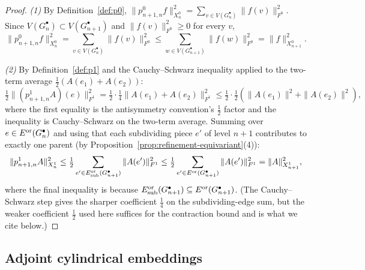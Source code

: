\documentclass[11pt, a4paper]{amsart}
\theoremstyle{definition}
\begin{document}
\begin{proof}
\emph{(1)} By Definition~\ref{def:p0},
$\|p_{n+1, n}^0 f\|_{X_n^0}^2 = \sum_{v \in V(G_n^\bullet)}
\|f(v)\|_{F^0}^2$. Since $V(G_n^\bullet) \subset
V(G_{n+1}^\bullet)$ and $\|f(v)\|_{F^0}^2 \geq 0$ for every $v$,
\[
  \|p_{n+1, n}^0 f\|_{X_n^0}^2 = \sum_{v \in V(G_n^\bullet)}
    \|f(v)\|_{F^0}^2 \leq \sum_{w \in V(G_{n+1}^\bullet)}
    \|f(w)\|_{F^0}^2 = \|f\|_{X_{n+1}^0}^2.
\]

\emph{(2)} By Definition~\ref{def:p1} and the Cauchy--Schwarz
inequality applied to the two-term average $\tfrac{1}{2}(A(e_1) +
A(e_2))$:
\[
  \tfrac{1}{2}\|(p_{n+1, n}^1 A)(e)\|_{F^1}^2
  = \tfrac{1}{2} \cdot \tfrac{1}{4} \|A(e_1) + A(e_2)\|_{F^1}^2
  \leq \tfrac{1}{2} \cdot \tfrac{1}{2} (\|A(e_1)\|^2 + \|A(e_2)\|^2),
\]
where the first equality is the antisymmetry convention's
$\tfrac{1}{2}$ factor and the inequality is Cauchy--Schwarz on the
two-term average. Summing over $e \in E^{\rm or}(G_n^\bullet)$
and using that each subdividing piece $e'$ of level $n+1$
contributes to exactly one parent (by
Proposition~\ref{prop:refinement-equivariant}(4)):
\[
  \|p_{n+1, n}^1 A\|_{X_n^1}^2
  \leq \tfrac{1}{2} \sum_{e' \in E^{\rm or}_{\rm sub}(G_{n+1}^
    \bullet)} \|A(e')\|^2_{F^1}
  \leq \tfrac{1}{2} \sum_{e' \in E^{\rm or}(G_{n+1}^\bullet)}
    \|A(e')\|^2_{F^1}
  = \|A\|_{X_{n+1}^1}^2,
\]
where the final inequality is because $E^{\rm or}_{\rm sub}
(G_{n+1}^\bullet) \subseteq E^{\rm or}(G_{n+1}^\bullet)$.
(The Cauchy--Schwarz step gives the sharper coefficient
$\tfrac{1}{4}$ on the subdividing-edge sum, but the weaker
coefficient $\tfrac{1}{2}$ used here suffices for the
contraction bound and is what we cite below.)
\end{proof}

\subsection{Adjoint cylindrical embeddings}
\end{document}
